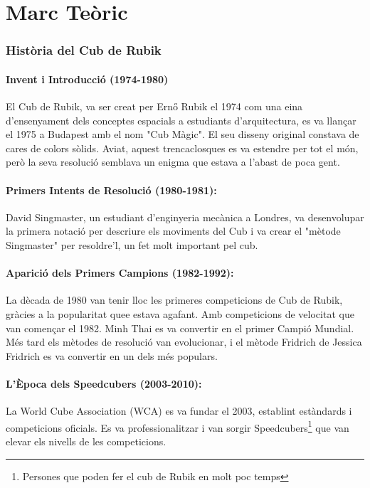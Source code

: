 \part*{Marc Teòric}
\section{Història del Cub de Rubik}

\subsection{Invent i Introducció (1974-1980)}

El Cub de Rubik, va ser creat per Ernő Rubik el 1974 com una eina d'ensenyament dels conceptes espacials a estudiants d'arquitectura, es va llançar el 1975 a Budapest amb el nom "Cub Màgic". El seu disseny original constava de cares de colors sòlids. Aviat, aquest trencaclosques es va estendre per tot el món, però la seva resolució semblava un enigma que estava a l'abast de poca gent.

\subsection{Primers Intents de Resolució (1980-1981):}

David Singmaster, un estudiant d'enginyeria mecànica a Londres, va desenvolupar la primera notació per descriure els moviments del Cub i va crear el "mètode Singmaster" per resoldre'l, un fet molt important pel cub.

\subsection{Aparició dels Primers Campions (1982-1992):}

La dècada de 1980 van tenir lloc les primeres competicions de Cub de Rubik, gràcies a la popularitat quee estava agafant. Amb competicions de velocitat que van començar el 1982. Minh Thai es va convertir en el primer Campió Mundial. Més tard els mètodes de resolució van evolucionar, i el mètode Fridrich de Jessica Fridrich es va convertir en un dels més populars.

\subsection{L'Època dels Speedcubers (2003-2010):}

La World Cube Association (WCA) es va fundar el 2003, establint estàndards i competicions oficials. Es va professionalitzar i van sorgir Speedcubers\footnote{Persones que poden fer el cub de Rubik en molt poc temps} que van elevar els nivells de les competicions.


